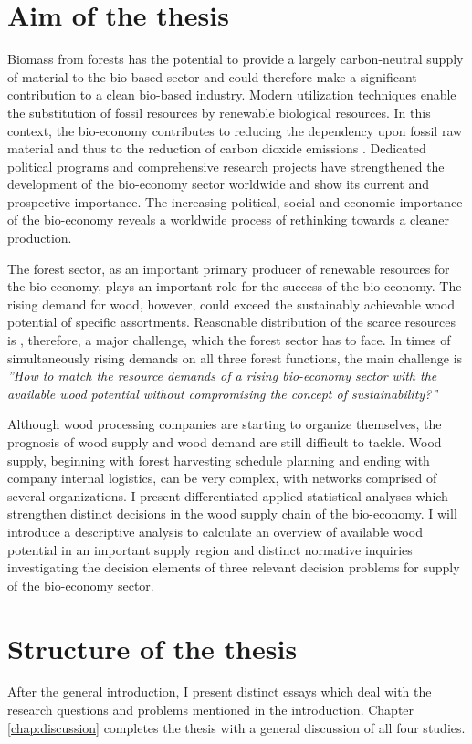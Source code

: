 \section{Aim of the thesis}
\label{sec:intro:aim}
Biomass from forests has the potential to provide a largely carbon-neutral supply of material to the bio-based sector and could therefore make a significant contribution to a clean bio-based industry. Modern utilization techniques enable the substitution of fossil resources by renewable biological resources. In this context, the bio-economy contributes to reducing the dependency upon fossil raw material and thus to the reduction of carbon dioxide emissions \citep[p. 4]{ingrao_2016}. Dedicated political programs and comprehensive research projects have strengthened the development of the bio-economy sector worldwide and show its current and prospective importance. The increasing political, social and economic importance of the bio-economy \citep[e.g.][p. 15-16]{bmel_2014b} reveals a worldwide process of rethinking towards a cleaner production.

The forest sector, as an important primary producer of renewable resources for the bio-economy, plays an important role for the success of the bio-economy. The rising demand for wood, however, could exceed the sustainably achievable wood potential of specific assortments. Reasonable distribution of the scarce resources is , therefore, a major challenge, which the forest sector has to face. In times of simultaneously rising demands on all three forest functions, the main challenge is \textit{''How to match the resource demands of a rising bio-economy sector with the available wood potential without compromising the concept of sustainability?''}

Although wood processing companies are starting to organize themselves, the prognosis of wood supply and wood demand are still difficult to tackle. Wood supply, beginning with forest harvesting schedule planning and ending with company internal logistics, can be very complex, with networks comprised of several organizations. I present differentiated applied statistical analyses which strengthen distinct decisions in the wood supply chain of the bio-economy. I will introduce a descriptive analysis to calculate an overview of available wood potential in an important supply region and distinct normative inquiries investigating the decision elements of three relevant decision problems for supply of the bio-economy sector.
	
\section{Structure of the thesis}
\label{sec:intro:struct}
After the general introduction, I present distinct essays which deal with the research questions and problems mentioned in the introduction. Chapter \ref{chap:discussion} completes the thesis with a general discussion of all four studies.

